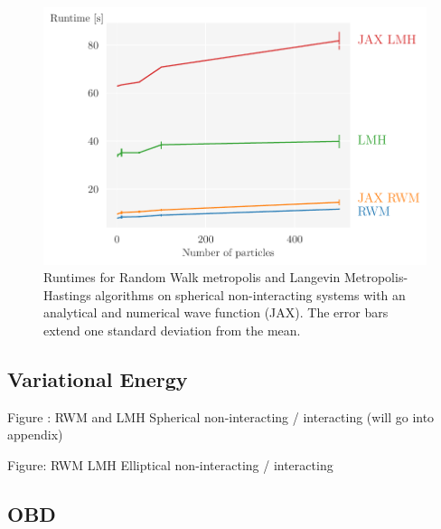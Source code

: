 \begin{figure}[!htb]
\begin{center}\includegraphics[width=\textwidth]{latex/figures/runtime_comparisons.pdf}
\end{center}
\caption{Runtimes for Random Walk metropolis and Langevin Metropolis-Hastings algorithms on spherical non-interacting systems with an analytical and numerical wave function (JAX). The error bars extend one standard deviation from the mean.}
\label{fig:runtime_comparison}
\end{figure}

\subsection{Variational Energy}

Figure : RWM and LMH Spherical non-interacting / interacting (will go into appendix)

Figure: RWM LMH Elliptical non-interacting / interacting  

\subsection{OBD}

